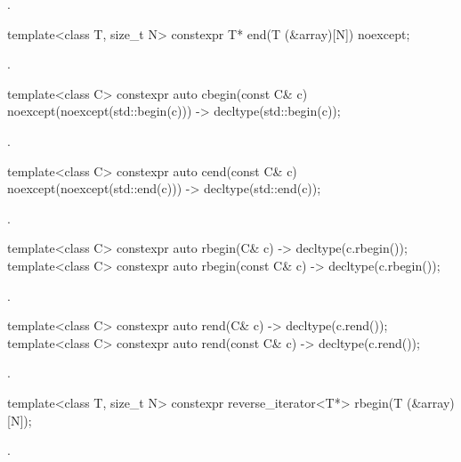 \begin{itemdescr}
\pnum
\returns
{}.
\end{itemdescr}

%
\begin{itemdecl}
template<class T, size_t N> constexpr T* end(T (&array)[N]) noexcept;
\end{itemdecl}

\begin{itemdescr}
\pnum
\returns
{}.
\end{itemdescr}

%
\begin{itemdecl}
template<class C> constexpr auto cbegin(const C& c) noexcept(noexcept(std::begin(c)))
  -> decltype(std::begin(c));
\end{itemdecl}
\begin{itemdescr}
\pnum
\returns
{}.
\end{itemdescr}

%
\begin{itemdecl}
template<class C> constexpr auto cend(const C& c) noexcept(noexcept(std::end(c)))
  -> decltype(std::end(c));
\end{itemdecl}
\begin{itemdescr}
\pnum
\returns
{}.
\end{itemdescr}

%
\begin{itemdecl}
template<class C> constexpr auto rbegin(C& c) -> decltype(c.rbegin());
template<class C> constexpr auto rbegin(const C& c) -> decltype(c.rbegin());
\end{itemdecl}
\begin{itemdescr}
\pnum
\returns
{}.
\end{itemdescr}

%
\begin{itemdecl}
template<class C> constexpr auto rend(C& c) -> decltype(c.rend());
template<class C> constexpr auto rend(const C& c) -> decltype(c.rend());
\end{itemdecl}
\begin{itemdescr}
\pnum
\returns
{}.
\end{itemdescr}

%
\begin{itemdecl}
template<class T, size_t N> constexpr reverse_iterator<T*> rbegin(T (&array)[N]);
\end{itemdecl}
\begin{itemdescr}
\pnum
\returns
{}.
\end{itemdescr}

